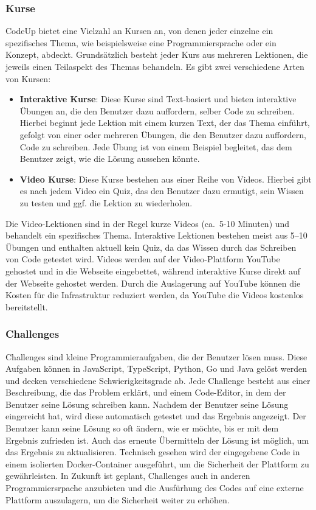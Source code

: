 \documentclass[main.tex]{subfiles}
\begin{document}
    \subsubsection{Kurse}
    CodeUp bietet eine Vielzahl an Kursen an, von denen jeder einzelne ein spezifisches Thema, wie beispielsweise eine Programmiersprache oder ein Konzept, abdeckt.
    Grundsätzlich besteht jeder Kurs aus mehreren Lektionen, die jeweils einen Teilaspekt des Themas behandeln.
    Es gibt zwei verschiedene Arten von Kursen:
    \begin{itemize}
        \item \textbf{Interaktive Kurse}: Diese Kurse sind Text-basiert und bieten interaktive Übungen an, die den Benutzer dazu auffordern, selber Code zu schreiben.
        Hierbei beginnt jede Lektion mit einem kurzen Text, der das Thema einführt, gefolgt von einer oder mehreren Übungen, die den Benutzer dazu auffordern, Code zu schreiben.
        Jede Übung ist von einem Beispiel begleitet, das dem Benutzer zeigt, wie die Lösung aussehen könnte.
        \item \textbf{Video Kurse}: Diese Kurse bestehen aus einer Reihe von Videos.
        Hierbei gibt es nach jedem Video ein Quiz, das den Benutzer dazu ermutigt, sein Wissen zu testen und ggf. die Lektion zu wiederholen.
    \end{itemize}
    Die Video-Lektionen sind in der Regel kurze Videos (ca.~5-10 Minuten) und behandelt ein spezifisches Thema.
    Interaktive Lektionen bestehen meist aus 5--10 Übungen und enthalten aktuell kein Quiz, da das Wissen durch das Schreiben von Code getestet wird.
    Videos werden auf der Video-Plattform YouTube gehostet und in die Webseite eingebettet, während interaktive Kurse direkt auf der Webseite gehostet werden.
    Durch die Auslagerung auf YouTube können die Kosten für die Infrastruktur reduziert werden, da YouTube die Videos kostenlos bereitstellt.
    \subsubsection{Challenges}
    Challenges sind kleine Programmieraufgaben, die der Benutzer lösen muss.
    Diese Aufgaben können in JavaScript, TypeScript, Python, Go und Java gelöst werden und decken verschiedene Schwierigkeitsgrade ab.
    Jede Challenge besteht aus einer Beschreibung, die das Problem erklärt, und einem Code-Editor, in dem der Benutzer seine Lösung schreiben kann.
    Nachdem der Benutzer seine Lösung eingereicht hat, wird diese automatisch getestet und das Ergebnis angezeigt.
    Der Benutzer kann seine Lösung so oft ändern, wie er möchte, bis er mit dem Ergebnis zufrieden ist.
    Auch das erneute Übermitteln der Lösung ist möglich, um das Ergebnis zu aktualisieren.
    Technisch gesehen wird der eingegebene Code in einem isolierten Docker-Container ausgeführt, um die Sicherheit der Plattform zu gewährleisten.
    In Zukunft ist geplant, Challenges auch in anderen Programmiersrpache anzubieten und die Ausfürhung des Codes auf eine externe Plattform auszulagern, um die Sicherheit weiter zu erhöhen.
\end{document}

